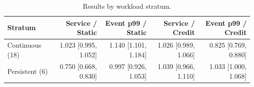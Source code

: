\begin{table}[!t]
\centering\small
\caption{Results by workload stratum.}
\label{tab:strata}
\begin{tabular}{@{}lrrrr@{}}\toprule
Stratum & Service / Static & Event p99 / Static & Service / Credit & Event p99 / Credit \\
\midrule
Continuous (18) & 1.023 [0.995, 1.052] & 1.140 [1.101, 1.184] & 1.026 [0.989, 1.066] & 0.825 [0.769, 0.880] \\
Persistent (6) & 0.750 [0.668, 0.830] & 0.997 [0.926, 1.053] & 1.039 [0.966, 1.110] & 1.033 [1.000, 1.068] \\
\bottomrule\end{tabular}
\end{table}
